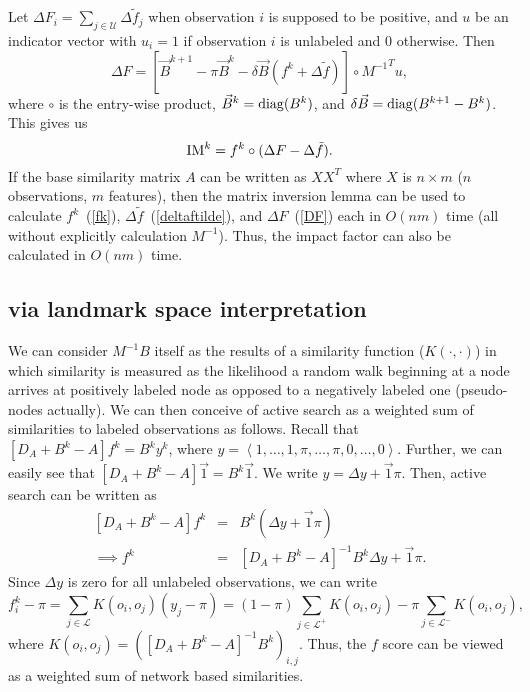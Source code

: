 \documentclass[12pt]{article}
\begin{document}
Let $\Delta F_i = \sum_{j\in \mathcal{U}} \Delta \tilde{f}_j$ when observation $i$ is supposed to be positive, and $u$ be an indicator vector with $u_i=1$ if observation $i$ is unlabeled and $0$ otherwise. Then
\begin{equation}
  \Delta F = \left[\vec{B}^{k+1}-\pi \vec{B}^k - \delta \vec{B}(f^k+\Delta \tilde{f}) \right]\circ {M^{-1}}^T u, \label{DF}
\end{equation}
where $\circ$ is the entry-wise product, $\vec{B}^k = {\rm diag}(B^k)$, and $\delta \vec{B} = {\rm diag}(B^{k+1}-B^k)$. This gives us
\begin{equation}
   {\rm IM}^k = f^k \circ (\Delta F-\Delta \tilde{f}).
\end{equation}
If the base similarity matrix $A$ can be written as $XX^T$ where $X$ is $n\times m$ ($n$ observations, $m$ features), then the matrix inversion lemma can be used to calculate $f^k$~(\ref{fk}), $\Delta \tilde{f}$~(\ref{deltaftilde}), and $\Delta F$~(\ref{DF}) each in $O(nm)$ time (all without explicitly calculation $M^{-1}$). Thus, the impact factor can also be calculated in $O(nm)$ time.

\subsection{via landmark space interpretation}
We can consider $M^{-1}B$ itself as the results of a similarity function ($K(\cdot,\cdot)$) in which similarity is measured as the likelihood a random walk beginning at a node arrives at positively labeled node as opposed to a negatively labeled one (pseudo-nodes actually). We can then conceive of active search as a weighted sum of similarities to labeled observations as follows. Recall that $\left[D_A+B^k-A\right]f^k = B^k y^k$, where $y=\left<1,\dots,1,\pi,\dots,\pi,0,\dots,0\right>$. Further, we can easily see that $\left[D_A+B^k-A\right]\vec{1} = B^k \vec{1}$. We write $y=\Delta y + \vec{1}\pi$. Then, active search can be written as
\begin{eqnarray}
   \left[D_A+B^k-A\right]f^k &=& B^k \left( \Delta y +\vec{1}\pi \right) \\
   \implies f^k &=& \left[D_A+B^k-A\right]^{-1} B^k \Delta y + \vec{1} \pi.
\end{eqnarray}
Since $\Delta y$ is zero for all unlabeled observations, we can write 
\begin{equation}
  f^k_i-\pi = \sum_{j\in \mathcal{L}} K(o_i,o_j)(y_j-\pi)=(1-\pi)\sum_{j\in \mathcal{L}^+} K(o_i,o_j)-\pi\sum_{j\in \mathcal{L}^-} K(o_i,o_j),
\end{equation}
where $K(o_i,o_j)= \left(\left[D_A+B^k-A\right]^{-1} B^k\right)_{i,j}$. Thus, the $f$ score can be viewed as a weighted sum of network based similarities.
\end{document}
